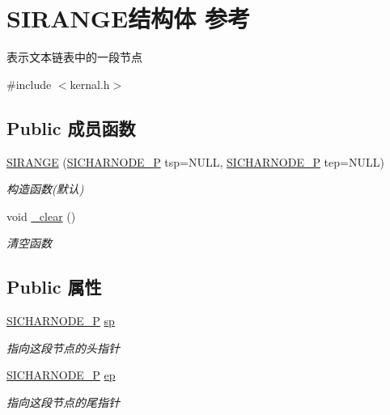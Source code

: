 \hypertarget{struct_s_i_r_a_n_g_e}{}\section{S\+I\+R\+A\+N\+G\+E结构体 参考}
\label{struct_s_i_r_a_n_g_e}


表示文本链表中的一段节点  




{\ttfamily \#include $<$kernal.\+h$>$}

\subsection*{Public 成员函数}
\begin{DoxyCompactItemize}
\item 
\mbox{\label{struct_s_i_r_a_n_g_e_a7c9322d5aec16acda0c4b95a9d48891a}} 
\hyperlink{struct_s_i_r_a_n_g_e_a7c9322d5aec16acda0c4b95a9d48891a}{S\+I\+R\+A\+N\+GE} (\hyperlink{class_s_i_c_h_a_r_n_o_d_e}{S\+I\+C\+H\+A\+R\+N\+O\+D\+E\+\_\+P} tsp=N\+U\+LL, \hyperlink{class_s_i_c_h_a_r_n_o_d_e}{S\+I\+C\+H\+A\+R\+N\+O\+D\+E\+\_\+P} tep=N\+U\+LL)
\begin{DoxyCompactList}\small\item\em 构造函数(默认) \end{DoxyCompactList}\item 
void \hyperlink{struct_s_i_r_a_n_g_e_afa57adc9093ce9213bedf4bb4c74310a}{\+\_\+clear} ()
\begin{DoxyCompactList}\small\item\em 清空函数~\newline
\end{DoxyCompactList}\end{DoxyCompactItemize}
\subsection*{Public 属性}
\begin{DoxyCompactItemize}
\item 
\hyperlink{class_s_i_c_h_a_r_n_o_d_e}{S\+I\+C\+H\+A\+R\+N\+O\+D\+E\+\_\+P} \hyperlink{struct_s_i_r_a_n_g_e_a7acdf296d873d6ed6fc203674109b715}{sp}
\begin{DoxyCompactList}\small\item\em 指向这段节点的头指针 \end{DoxyCompactList}\item 
\hyperlink{class_s_i_c_h_a_r_n_o_d_e}{S\+I\+C\+H\+A\+R\+N\+O\+D\+E\+\_\+P} \hyperlink{struct_s_i_r_a_n_g_e_aaa89b5ae16be7b890eba048bc212feec}{ep}
\begin{DoxyCompactList}\small\item\em 指向这段节点的尾指针 \end{DoxyCompactList}\end{DoxyCompactItemize}


